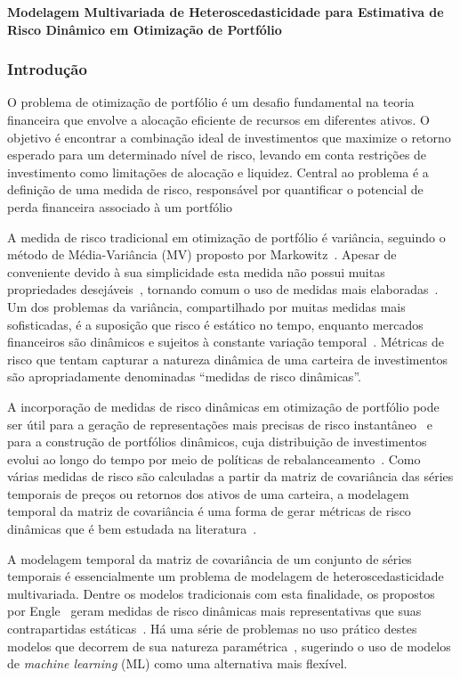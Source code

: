 \documentclass[a4paper, 12pt]{article}
\begin{document}
\textbf{Modelagem Multivariada de Heteroscedasticidade para Estimativa de Risco
Dinâmico em Otimização de Portfólio}
\subsubsection*{Introdução}
\begin{spacing}{.9  }
O problema de otimização de portfólio é um desafio fundamental na teoria
financeira que envolve a alocação eficiente de recursos em diferentes ativos. O
objetivo é encontrar a combinação ideal de investimentos que maximize o retorno
esperado para um determinado nível de risco, levando em conta restrições de
investimento como limitações de alocação e liquidez. Central ao problema é a
definição de uma medida de risco, responsável por quantificar o potencial de
perda financeira associado à um portfólio%

A medida de risco tradicional em otimização de portfólio é variância, seguindo
o método de Média-Variância (MV) proposto por Markowitz~\cite{markowitz}.
Apesar de conveniente devido à sua simplicidade esta medida não possui muitas
propriedades desejáveis~\cite{rachev}, tornando comum o uso de medidas mais
elaboradas~\cite{gambrah2014risk}. Um dos problemas da variância, compartilhado
por muitas medidas mais sofisticadas, é a
suposição que risco é estático no tempo, enquanto mercados financeiros são
dinâmicos e sujeitos à constante variação temporal~\cite{procacci}. Métricas de
risco que tentam capturar a natureza dinâmica de uma carteira de investimentos
são apropriadamente denominadas ``medidas de risco dinâmicas''.

A incorporação de medidas de risco dinâmicas em otimização de portfólio pode
ser útil para a geração de representações mais precisas de risco
instantâneo~\cite{chan1999portfolio} e para a construção de portfólios dinâmicos, cuja
distribuição de investimentos evolui ao longo do tempo por meio de políticas de
rebalanceamento~\cite{metin, holten}. Como várias medidas de risco são
calculadas a partir da matriz de covariância das séries temporais de preços ou
retornos dos ativos de uma carteira, a modelagem temporal da matriz de
covariância é uma forma de gerar métricas de risco dinâmicas que é bem estudada
na literatura~\cite{chan1999portfolio}.

A modelagem temporal da matriz de covariância de um conjunto de séries
temporais é essencialmente um problema de modelagem de heteroscedasticidade
multivariada. Dentre os modelos tradicionais com esta finalidade, os propostos
por Engle~\cite{bauwens} geram medidas de risco dinâmicas mais representativas
que suas contrapartidas estáticas~\cite{metin, holten, weirum}. Há uma série de
problemas no uso prático destes modelos que decorrem de sua natureza
paramétrica~\cite{morettin}, sugerindo o uso de modelos de \emph{machine
learning} (ML) como uma alternativa mais flexível.


\end{spacing}
\end{document}
